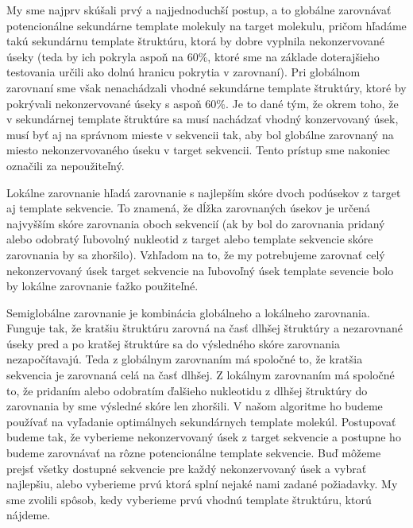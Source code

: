 \indent My sme najprv skúšali prvý a najjednoduchší postup, a to globálne zarovnávať potencionálne sekundárne template molekuly na target molekulu, pričom hľadáme takú sekundárnu template štruktúru, ktorá by dobre vyplnila nekonzervované úseky (teda by ich pokryla aspoň na 60\%, ktoré sme na základe doterajšieho testovania určili ako dolnú hranicu pokrytia v zarovnaní). Pri globálnom zarovnaní sme však nenachádzali vhodné sekundárne template štruktúry, ktoré by pokrývali nekonzervované úseky s aspoň 60\%. Je to dané tým, že okrem toho, že v sekundárnej template štruktúre sa musí nachádzať vhodný konzervovaný úsek, musí byť aj na správnom mieste v sekvencii tak, aby bol globálne zarovnaný na miesto nekonzervovaného úseku v target sekvencii. Tento prístup sme nakoniec označili za nepoužiteľný.


\indent Lokálne zarovnanie hľadá zarovnanie s najlepším skóre dvoch podúsekov z target aj template sekvencie. To znamená, že dĺžka zarovnaných úsekov je určená najvyšším skóre zarovnania oboch sekvencií (ak by bol do zarovnania pridaný alebo odobratý ľubovolný nukleotid z target alebo template sekvencie skóre zarovnania by sa zhoršilo). Vzhľadom na to, že my potrebujeme zarovnať celý nekonzervovaný úsek target sekvencie na ľubovoľný úsek template sevencie bolo by lokálne zarovnanie ťažko použiteľné.


\indent Semiglobálne zarovnanie je kombinácia globálneho a lokálneho zarovnania. Funguje tak, že kratšiu štruktúru zarovná na časť dlhšej štruktúry a nezarovnané úseky pred a po kratšej štruktúre sa do výsledného skóre zarovnania nezapočítavajú. Teda z globálnym zarovnaním má spoločné to, že kratšia sekvencia je zarovnaná celá na časť dlhšej. Z lokálnym zarovnaním má spoločné to, že pridaním alebo odobratím ďalšieho nukleotidu z dlhšej štruktúry do zarovnania by sme výsledné skóre len zhoršili. V našom algoritme ho budeme používať na vyľadanie optimálnych sekundárnych template molekúl. Postupovať budeme tak, že vyberieme nekonzervovaný úsek z target sekvencie a postupne ho budeme zarovnávať na rôzne potencionálne template sekvencie. Buď môžeme prejsť všetky dostupné sekvencie pre každý nekonzervovaný úsek a vybrať najlepšiu, alebo vyberieme prvú ktorá splní nejaké nami zadané požiadavky. My sme zvolili spôsob, kedy vyberieme prvú vhodnú template štruktúru, ktorú nájdeme.


